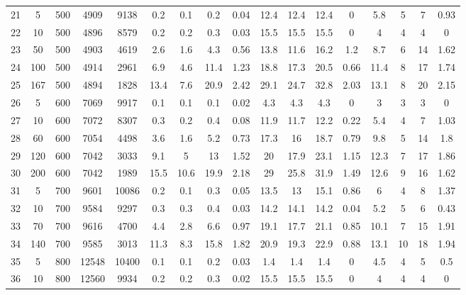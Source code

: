 \documentclass[11pt]{article}
\begin{document}
\begin{appendices}
\begin{landscape}
\begin{longtable}[c]{ccccc|cccc|cccc|cccc}
				\rowcolor[HTML]{EFEFEF} 
				21 & 5 & 500 & 4909 & 9138 & 0.2 & 0.1 & 0.2 & 0.04 & 12.4 & 12.4 & 12.4 & 0 & 5.8 & 5 & 7 & 0.93 \\
				\rowcolor[HTML]{EFEFEF} 
				22 & 10 & 500 & 4896 & 8579 & 0.2 & 0.2 & 0.3 & 0.03 & 15.5 & 15.5 & 15.5 & 0 & 4 & 4 & 4 & 0 \\
				\rowcolor[HTML]{EFEFEF} 
				23 & 50 & 500 & 4903 & 4619 & 2.6 & 1.6 & 4.3 & 0.56 & 13.8 & 11.6 & 16.2 & 1.2 & 8.7 & 6 & 14 & 1.62 \\
				\rowcolor[HTML]{EFEFEF} 
				24 & 100 & 500 & 4914 & 2961 & 6.9 & 4.6 & 11.4 & 1.23 & 18.8 & 17.3 & 20.5 & 0.66 & 11.4 & 8 & 17 & 1.74 \\
				\rowcolor[HTML]{EFEFEF} 
				25 & 167 & 500 & 4894 & 1828 & 13.4 & 7.6 & 20.9 & 2.42 & 29.1 & 24.7 & 32.8 & 2.03 & 13.1 & 8 & 20 & 2.15 \\
				26 & 5 & 600 & 7069 & 9917 & 0.1 & 0.1 & 0.1 & 0.02 & 4.3 & 4.3 & 4.3 & 0 & 3 & 3 & 3 & 0 \\
				27 & 10 & 600 & 7072 & 8307 & 0.3 & 0.2 & 0.4 & 0.08 & 11.9 & 11.7 & 12.2 & 0.22 & 5.4 & 4 & 7 & 1.03 \\
				28 & 60 & 600 & 7054 & 4498 & 3.6 & 1.6 & 5.2 & 0.73 & 17.3 & 16 & 18.7 & 0.79 & 9.8 & 5 & 14 & 1.8 \\
				29 & 120 & 600 & 7042 & 3033 & 9.1 & 5 & 13 & 1.52 & 20 & 17.9 & 23.1 & 1.15 & 12.3 & 7 & 17 & 1.86 \\
				30 & 200 & 600 & 7042 & 1989 & 15.5 & 10.6 & 19.9 & 2.18 & 29 & 25.8 & 31.9 & 1.49 & 12.6 & 9 & 16 & 1.62 \\
				\rowcolor[HTML]{EFEFEF} 
				31 & 5 & 700 & 9601 & 10086 & 0.2 & 0.1 & 0.3 & 0.05 & 13.5 & 13 & 15.1 & 0.86 & 6 & 4 & 8 & 1.37 \\
				\rowcolor[HTML]{EFEFEF} 
				32 & 10 & 700 & 9584 & 9297 & 0.3 & 0.3 & 0.4 & 0.03 & 14.2 & 14.1 & 14.2 & 0.04 & 5.2 & 5 & 6 & 0.43 \\
				\rowcolor[HTML]{EFEFEF} 
				33 & 70 & 700 & 9616 & 4700 & 4.4 & 2.8 & 6.6 & 0.97 & 19.1 & 17.7 & 21.1 & 0.85 & 10.1 & 7 & 15 & 1.91 \\
				\rowcolor[HTML]{EFEFEF} 
				34 & 140 & 700 & 9585 & 3013 & 11.3 & 8.3 & 15.8 & 1.82 & 20.9 & 19.3 & 22.9 & 0.88 & 13.1 & 10 & 18 & 1.94 \\
				35 & 5 & 800 & 12548 & 10400 & 0.1 & 0.1 & 0.2 & 0.03 & 1.4 & 1.4 & 1.4 & 0 & 4.5 & 4 & 5 & 0.5 \\
				36 & 10 & 800 & 12560 & 9934 & 0.2 & 0.2 & 0.3 & 0.02 & 15.5 & 15.5 & 15.5 & 0 & 4 & 4 & 4 & 0 \\

\end{longtable}
\end{landscape}
\end{appendices}
\end{document}
